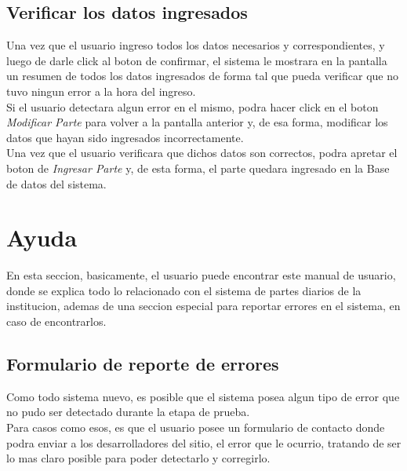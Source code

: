 \documentclass[12pt,a4paper]{article}
\begin{document}
\subsection{Verificar los datos ingresados}
Una vez que el usuario ingreso todos los datos necesarios y correspondientes, y luego de darle click al boton de confirmar, el sistema le mostrara en la pantalla un resumen de todos los datos ingresados de forma tal que pueda verificar que no tuvo ningun error a la hora del ingreso. \\
Si el usuario detectara algun error en el mismo, podra hacer click en el boton \textit{Modificar Parte} para volver a la pantalla anterior y, de esa forma, modificar los datos que hayan sido ingresados incorrectamente. \\
Una vez que el usuario verificara que dichos datos son correctos, podra apretar el boton de \textit{Ingresar Parte} y, de esta forma, el parte quedara ingresado en la Base de datos del sistema.

\section{Ayuda}
En esta seccion, basicamente, el usuario puede encontrar este manual de usuario, donde se explica todo lo relacionado con el sistema de partes diarios de la institucion, ademas de una seccion especial para reportar errores en el sistema, en caso de encontrarlos.
\subsection{Formulario de reporte de errores}
Como todo sistema nuevo, es posible que el sistema posea algun tipo de error que no pudo ser detectado durante la etapa de prueba. \\
Para casos como esos, es que el usuario posee un formulario de contacto donde podra enviar a los desarrolladores del sitio, el error que le ocurrio, tratando de ser lo mas claro posible para poder detectarlo y corregirlo.
\end{document}

